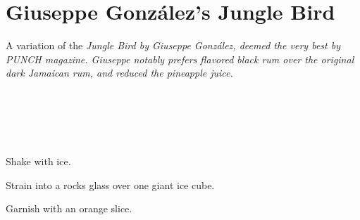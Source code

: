 \section[Jungle Bird, Giuseppe]{
    Giuseppe Gonz\'{a}lez's Jungle Bird
}

\begin{recipestats}[
        servings=1,
        preptime=5~\minute,
        original=\citefield{giuseppeJungleBird}{title} \cite{giuseppeJungleBird},
    ]
\end{recipestats}

\begin{recipeabstract}
    A variation of the \it{Jungle Bird} by Giuseppe Gonz\'{a}lez, deemed the
    very best by \it{PUNCH} magazine\cite{originalJungleBird}.
    Giuseppe notably prefers flavored black rum over the original dark
    Jamaican rum, and reduced the pineapple juice.
\end{recipeabstract}

\begin{ingredientcolumns}[1]
    \begin{ingredientblock}
        \\
        \\
        \\
        \\
    \end{ingredientblock}
\end{ingredientcolumns}

\begin{preparation}
\item Shake with ice.
\item Strain into a rocks glass over one giant ice cube.
\item Garnish with an orange slice.
\end{preparation}

